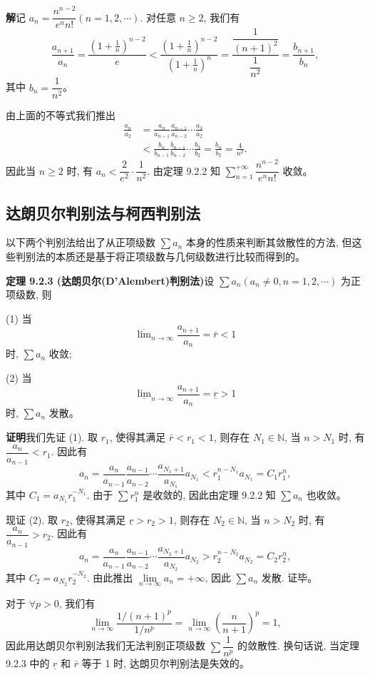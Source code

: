 \documentclass[UTF8,12pt,a4paper,fontset=fandol]{ctexart}
\begin{document}
\noindent\textbf{解}\quad 记 $a_n=\dfrac{n^{n-2}}{e^n n!}(n=1,2,\cdots)$. 对任意 $n\geq2$, 我们有
\[
  \frac{a_{n+1}}{a_n}
  =\frac{\left(1+\frac1n\right)^{n-2}}{e}
  <\frac{\left(1+\frac1n\right)^{n-2}}{\left(1+\frac1n\right)^n}
  =\frac{\dfrac1{(n+1)^2}}{\dfrac1{n^2}}
 =\frac{b_{n+1}}{b_n},
\]
其中 $b_n=\dfrac1{n^2}$。

由上面的不等式我们推出
\[
\begin{aligned}
  \frac{a_n}{a_2}
  &=\frac{a_n}{a_{n-1}}\frac{a_{n-1}}{a_{n-2}}\cdots\frac{a_3}{a_2}\\
  &<\frac{b_n}{b_{n-1}}\frac{b_{n-1}}{b_{n-2}}\cdots\frac{b_3}{b_2}
  =\frac{b_n}{b_2}=\frac4{n^2}.
\end{aligned}
\]
因此当 $n\geq2$ 时, 有 $a_n<\dfrac2{e^2}\cdot\dfrac1{n^2}$. 由定理 9.2.2 知 $\sum\limits_{n=1}^{+\infty}\dfrac{n^{n-2}}{e^n n!}$ 收敛。

\subsection{达朗贝尔判别法与柯西判别法}

以下两个判别法给出了从正项级数 $\sum a_n$ 本身的性质来判断其敛散性的方法, 但这些判别法的本质还是基于将正项级数与几何级数进行比较而得到的。

\noindent\textbf{定理 9.2.3 (达朗贝尔(D'Alembert)判别法)}\quad 设 $\sum a_n(a_n\neq0,n=1,2,\cdots)$ 为正项级数, 则

(1) 当
\[
  \overline{\lim}_{n\to\infty}\frac{a_{n+1}}{a_n}=\bar r<1
\]
时, $\sum a_n$ 收敛;

(2) 当
\[
  \underline{\lim}_{n\to\infty}\frac{a_{n+1}}{a_n}=\underline r>1
\]
时, $\sum a_n$ 发散。

\noindent\textbf{证明}\quad 我们先证 (1). 取 $r_1$, 使得其满足 $\bar r<r_1<1$, 则存在 $N_1\in\mathbb{N}$, 当 $n>N_1$ 时, 有 $\dfrac{a_n}{a_{n-1}}<r_1$. 因此有
\[
  a_n=\frac{a_n}{a_{n-1}}\frac{a_{n-1}}{a_{n-2}}\cdots\frac{a_{N_1+1}}{a_{N_1}}a_{N_1}
  <r_1^{n-N_1}a_{N_1}=C_1r_1^n,
\]
其中 $C_1=a_{N_1}r_1^{-N_1}$. 由于 $\sum r_1^n$ 是收敛的, 因此由定理 9.2.2 知 $\sum a_n$ 也收敛。

现证 (2). 取 $r_2$, 使得其满足 $\underline r>r_2>1$, 则存在 $N_2\in\mathbb{N}$, 当 $n>N_2$ 时, 有 $\dfrac{a_n}{a_{n-1}}>r_2$. 因此有
\[
  a_n=\frac{a_n}{a_{n-1}}\frac{a_{n-1}}{a_{n-2}}\cdots\frac{a_{N_2+1}}{a_{N_2}}a_{N_2}
  >r_2^{n-N_2}a_{N_2}=C_2r_2^n,
\]
其中 $C_2=a_{N_2}r_2^{-N_2}$. 由此推出 $\lim\limits_{n\to\infty}a_n=+\infty$, 因此 $\sum a_n$ 发散. 证毕。

对于 $\forall p>0$, 我们有
\[
  \lim_{n\to\infty}\frac{1/(n+1)^p}{1/n^p}
  =\lim_{n\to\infty}\left(\frac{n}{n+1}\right)^p=1,
\]
因此用达朗贝尔判别法我们无法判别正项级数 $\sum\dfrac1{n^p}$ 的敛散性. 换句话说, 当定理 9.2.3 中的 $\underline r$ 和 $\bar r$ 等于 1 时, 达朗贝尔判别法是失效的。
\end{document}
